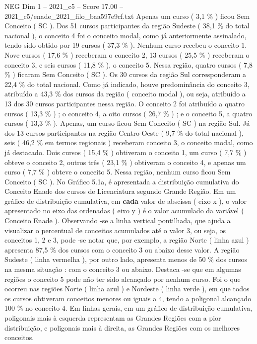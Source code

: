 \begin{textsample}{NEG Dim 1 – 2021\_c5 – Score 17.00 – 2021\_c5/enade\_2021\_filo\_baa597e9cf.txt}
Apenas um curso ( 3,1 \% ) ficou Sem Conceito ( SC ).
Dos 51 cursos participantes da região Sudeste ( 38,1 \% do total nacional ), o conceito 4 foi o conceito modal, como já anteriormente assinalado, tendo sido obtido por 19 cursos ( 37,3 \% ).
Nenhum curso recebeu o conceito 1.
Nove cursos ( 17,6 \% ) receberam o conceito 2, 13 cursos ( 25,5 \% ) receberam o conceito 3, e seis cursos ( 11,8 \% ), o conceito 5.
Nessa região, quatro cursos ( 7,8 \% ) ficaram Sem Conceito ( SC ).
Os 30 cursos da região Sul corresponderam a 22,4 \% do total nacional.
Como já indicado, houve predominância do conceito 3, atribuído a 43,3 \% dos cursos da região ( conceito modal ), ou seja, atribuído a 13 dos 30 cursos participantes nessa região.
O conceito 2 foi atribuído a quatro cursos ( 13,3 \% ) ; o conceito 4, a oito cursos ( 26,7 \% ) ; e o conceito 5, a quatro cursos ( 13,3 \% ).
Apenas, um curso ficou Sem Conceito ( SC ) na região Sul.
Já dos 13 cursos participantes na região Centro-Oeste ( 9,7 \% do total nacional ), seis ( 46,2 \% em termos regionais ) receberam conceito 3, o conceito modal, como já destacado.
Dois cursos ( 15,4 \% ) obtiveram o conceito 1, um curso ( 7,7 \% ) obteve o conceito 2, outros três ( 23,1 \% ) obtiveram o conceito 4, e apenas um curso ( 7,7 \% ) obteve o conceito 5.
Nessa região, nenhum curso ficou Sem Conceito ( SC ).
No Gráfico 5.1a, é apresentada a distribuição cumulativa do Conceito Enade dos cursos de Licenciatura segundo Grande Região.
Em um gráfico de distribuição cumulativa, em \textbf{cada} valor de abscissa ( eixo x ), o valor apresentado no eixo das ordenadas ( eixo y ) é o valor acumulado da variável ( Conceito Enade ).
Observando -se a linha vertical pontilhada, que ajuda a visualizar o percentual de conceitos acumulados até o valor 3, ou seja, os conceitos 1, 2 e 3, pode -se notar que, por exemplo, a região Norte ( linha azul ) apresenta 87,5 \% dos cursos com o conceito 3 ou abaixo desse valor.
A região Sudeste ( linha vermelha ), por outro lado, apresenta menos de 50 \% dos cursos na mesma situação : com o conceito 3 ou abaixo.
Destaca -se que em algumas regiões o conceito 5 pode não ter sido alcançado por nenhum curso.
Foi o que ocorreu nas regiões Norte ( linha azul ) e Nordeste ( linha verde ), em que todos os cursos obtiveram conceitos menores ou iguais a 4, tendo a poligonal alcançado 100 \% no conceito 4.
Em linhas gerais, em um gráfico de distribuição cumulativa, poligonais mais à esquerda representam as Grandes Regiões com a pior distribuição, e poligonais mais à direita, as Grandes Regiões com os melhores conceitos.

\end{textsample}
